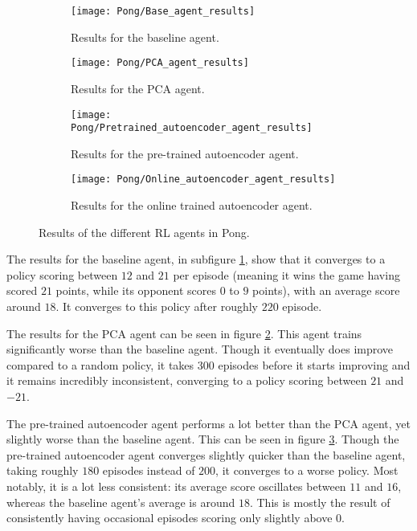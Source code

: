 \begin{figure}[h]
	\centering
	\begin{subfigure}[b]{0.49\textwidth}
		\texttt{[image: Pong/Base\_agent\_results]}
		\caption{Results for the baseline agent.}
		\label{fig:results-base-pong} 
	\end{subfigure}
	\begin{subfigure}[b]{0.49\textwidth}
		\texttt{[image: Pong/PCA\_agent\_results]}
		\caption{Results for the PCA agent.}
		\label{fig:results-pca-pong}
	\end{subfigure}
	
	\medskip
	\begin{subfigure}[b]{0.49\textwidth}
		\texttt{[image: Pong/Pretrained\_autoencoder\_agent\_results]}
		\caption{Results for the pre-trained autoencoder agent.}
		\label{fig:results-ae-pong}
	\end{subfigure}	
	\begin{subfigure}[b]{0.49\textwidth}
		\texttt{[image: Pong/Online\_autoencoder\_agent\_results]}
		\caption{Results for the online trained autoencoder agent.}
		\label{fig:results-online-ae-pong}
	\end{subfigure}
	\caption{Results of the different RL agents in Pong.}
	\label{fig:results-agents-pong}
\end{figure}

The results for the baseline agent, in subfigure \ref{fig:results-base-pong}, show that it converges to a policy scoring between $12$ and $21$ per episode (meaning it wins the game having scored $21$ points, while its opponent scores $0$ to $9$ points), with an average score around $18$. It converges to this policy after roughly $220$ episode.

The results for the PCA agent can be seen in figure \ref{fig:results-pca-pong}. This agent trains significantly worse than the baseline agent. Though it eventually does improve compared to a random policy, it takes $300$ episodes before it starts improving and it remains incredibly inconsistent, converging to a policy scoring between $21$ and $-21$. %

The pre-trained autoencoder agent performs a lot better than the PCA agent, yet slightly worse than the baseline agent. This can be seen in figure \ref{fig:results-ae-pong}. Though the pre-trained autoencoder agent converges slightly quicker than the baseline agent, taking roughly $180$ episodes instead of $200$, it converges to a worse policy. Most notably, it is a lot less consistent: its average score oscillates between $11$ and $16$, whereas the baseline agent's average is around $18$. This is mostly the result of consistently having occasional episodes scoring only slightly above $0$.

